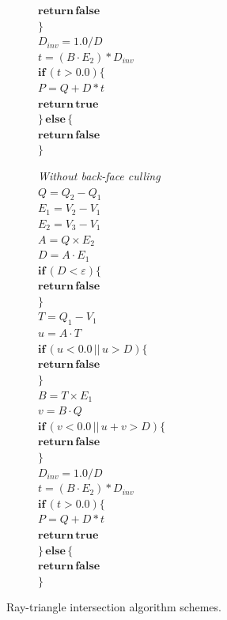 \begin{figure}[htbp]
\begin{subfigure}[t]{.4\linewidth}
		\quad $\mathbf{return \, false}$\\
		$\}$\\
		$D_{inv} = 1.0 / D$\\
		$t = (B \cdot E_2) * D_{inv}$\\
		$\mathbf{if} \, (t > 0.0) \{$\\
		\quad $P = Q + D * t$\\
		\quad $\mathbf{return \, true}$\\
		$\} \, \mathbf{else} \, \{$\\
		\quad $\mathbf{return \, false}$\\
		$\}$\\
	\end{subfigure}
\hfill
	\begin{subfigure}[t]{.4\textwidth}
		\raggedright
		\textit{Without back-face culling}\\
		\vspace{.5em}
		$Q = Q_2 - Q_1$\\
		$E_1 = V_2 - V_1$\\
		$E_2 = V_3 - V_1$\\
		$A = Q \times E_2$\\
		$D = A \cdot E_1$\\
		$\mathbf{if} \, (D < \varepsilon) \{$\\
		\quad $\mathbf{return \, false}$\\
		$\}$\\
		$T = Q_1 - V_1$\\
		$u = A \cdot T$\\
		$\mathbf{if} \, (u < 0.0 \, || \, u > D) \{$\\
		\quad $\mathbf{return \, false}$\\
		$\}$\\
		$B = T \times E_1$\\
		$v = B \cdot Q$\\
		$\mathbf{if} \, (v < 0.0 \, || \, u + v > D) \{$\\
		\quad \quad $\mathbf{return \, false}$\\
		$\}$\\
		$D_{inv} = 1.0 / D$\\
		$t = (B \cdot E_2) * D_{inv}$\\
		$\mathbf{if} \, (t > 0.0) \{$\\
		\quad $P = Q + D * t$\\
		\quad $\mathbf{return \, true}$\\
		$\} \, \mathbf{else} \, \{$\\
		\quad $\mathbf{return \, false}$\\
		$\}$\\
	\end{subfigure}
\hfill
\caption{Ray-triangle intersection algorithm schemes.}
\end{figure}